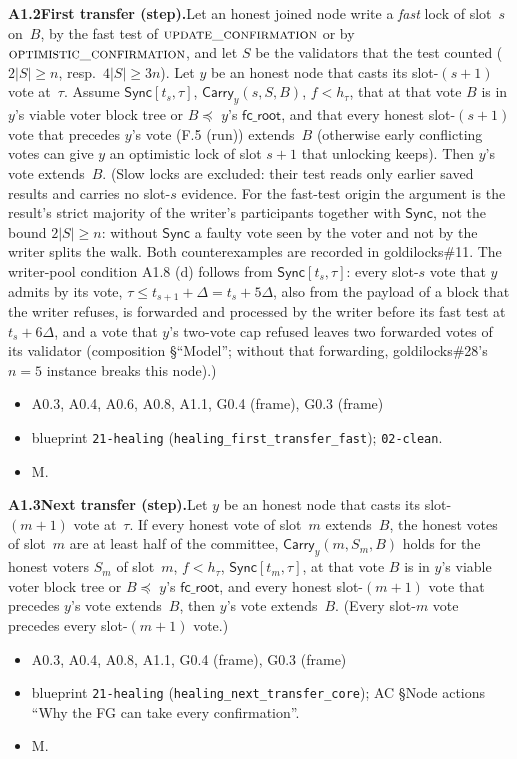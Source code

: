 \documentclass{article}
\newcommand{\fcroot}{\mathsf{fc\_root}}
\newcommand{\fname}[1]{\text{\textsc{#1}}}
\newcommand{\dagnode}[6]{%
\par\medskip\noindent\textbf{#1\enspace #2.}\enspace #3
\begin{itemize}[leftmargin=2.2em,itemsep=0pt,topsep=2pt]
\item[\emph{Uses}] #4
\item[\emph{Evid.}] #5
\item[\emph{Task}] #6
\end{itemize}}
\begin{document}
\dagnode{A1.2}{First transfer (step)}{Let an honest joined node write a
\emph{fast} lock of slot~$s$ on~$B$, by the fast test of
$\fname{update\_confirmation}$ or by $\fname{optimistic\_confirmation}$, and
let $S$ be the validators that the test counted ($2|S|\geq n$, resp.\
$4|S|\geq3n$).  Let $y$ be an honest node that casts its slot-$(s+1)$ vote
at~$\tau$.  Assume $\mathsf{Sync}[t_s,\tau]$, $\mathsf{Carry}_y(s,S,B)$,
$f<h_\tau$, that at that vote $B$ is in $y$'s viable voter block tree or
$B\preceq$ $y$'s $\fcroot$, and that every honest slot-$(s+1)$ vote that precedes
$y$'s vote (F.5 (run)) extends~$B$ (otherwise early conflicting votes can give $y$ an
optimistic lock of slot $s+1$ that unlocking keeps).  Then $y$'s vote
extends~$B$.  (Slow locks are excluded: their test reads only earlier saved
results and carries no slot-$s$ evidence.  For the fast-test origin the
argument is the result's strict majority of the writer's participants together
with $\mathsf{Sync}$, not the bound $2|S|\geq n$: without $\mathsf{Sync}$ a
faulty vote seen by the voter and not by the writer splits the walk.  Both
counterexamples are recorded in goldilocks\#11.  The writer-pool condition
A1.8 (d) follows from $\mathsf{Sync}[t_s,\tau]$: every slot-$s$ vote that $y$
admits by its vote, $\tau\leq t_{s+1}+\Delta=t_s+5\Delta$, also from the payload
of a block that the writer refuses, is forwarded and processed by the writer
before its fast test at $t_s+6\Delta$, and a vote that $y$'s two-vote cap
refused leaves two forwarded votes of its validator (composition
\S``Model''; without that forwarding, goldilocks\#28's $n=5$ instance
breaks this node).)}
{A0.3, A0.4, A0.6, A0.8, A1.1, G0.4 (frame), G0.3 (frame)}{blueprint \texttt{21-healing}
(\texttt{healing\_first\_transfer\_fast}); \texttt{02-clean}.}{M.}

\dagnode{A1.3}{Next transfer (step)}{Let $y$ be an honest node that casts its
slot-$(m+1)$ vote at~$\tau$.  If every honest vote of slot~$m$ extends~$B$, the
honest votes of slot~$m$ are at least half of the committee,
$\mathsf{Carry}_y(m,S_m,B)$ holds for the honest voters $S_m$ of slot~$m$,
$f<h_\tau$, $\mathsf{Sync}[t_m,\tau]$, at that vote $B$ is in $y$'s viable
voter block tree or $B\preceq$ $y$'s $\fcroot$, and every honest slot-$(m+1)$
vote that precedes $y$'s vote extends~$B$, then $y$'s vote extends~$B$.
(Every slot-$m$ vote precedes every slot-$(m+1)$ vote.)}
{A0.3, A0.4, A0.8, A1.1, G0.4 (frame), G0.3 (frame)}{blueprint \texttt{21-healing}
(\texttt{healing\_next\_transfer\_core}); AC \S Node actions ``Why the FG can
take every confirmation''.}{M.}
\end{document}
